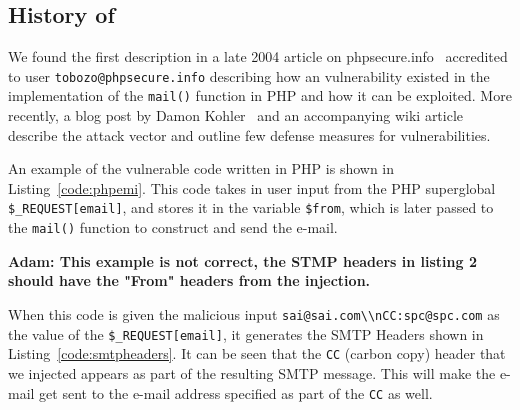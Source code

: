 \subsection{History of \ehi}

We found the first \ehi description in a late 2004 article on phpsecure.info~\cite{Tobozo} accredited to user \lstinline|tobozo@phpsecure.info| describing how an \ehi vulnerability existed in the implementation of the \texttt{mail()} function in PHP and how it can be exploited. More recently, a blog post by Damon Kohler~\cite{DK} and an accompanying wiki article~\cite{Injection} describe the attack vector and outline few defense measures for \ehi vulnerabilities.


An example of the vulnerable code written in PHP is shown in Listing~\ref{code:phpemi}. This code takes in user input from the PHP superglobal \texttt{\$\_REQUEST[\textquotesingle email\textquotesingle]}, and stores it in the variable \texttt{\$from}, which is later passed to the \texttt{mail()} function to construct and send the e-mail.




\textbf{Adam: This example is not correct, the STMP headers in listing 2 should have the "From" headers from the injection.}

When this code is given the malicious input \texttt{\lstinline{sai@sai.com\\nCC:spc@spc.com}} as the value of the \texttt{\$\_REQUEST[\textquotesingle email\textquotesingle]}, it generates the SMTP Headers shown in Listing~\ref{code:smtpheaders}. It can be seen that the \texttt{CC} (carbon copy) header that we injected appears as part of the resulting SMTP message. This will make the e-mail get sent to the e-mail address specified as part of the \texttt{CC} as well. 

%

